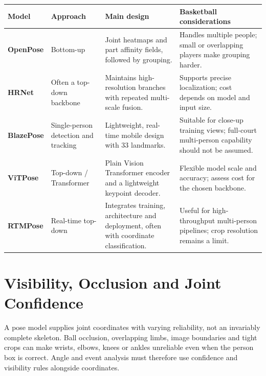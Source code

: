 \documentclass[11pt,a4paper,oneside]{report}
\begin{document}
\begin{tabularx}{\textwidth}{>{\bfseries\RaggedRight}p{2.7cm} p{3.1cm} Y Y}
\toprule
Model & Approach & Main design & Basketball considerations \\
\midrule
OpenPose & Bottom-up & Joint heatmaps and part affinity fields, followed by grouping. & Handles multiple people; small or overlapping players make grouping harder.\\
HRNet & Often a top-down backbone & Maintains high-resolution branches with repeated multi-scale fusion. & Supports precise localization; cost depends on model and input size.\\
BlazePose & Single-person detection and tracking & Lightweight, real-time mobile design with 33 landmarks. & Suitable for close-up training views; full-court multi-person capability should not be assumed.\\
ViTPose & Top-down / Transformer & Plain Vision Transformer encoder and a lightweight keypoint decoder. & Flexible model scale and accuracy; assess cost for the chosen backbone.\\
RTMPose & Real-time top-down & Integrates training, architecture and deployment, often with coordinate classification. & Useful for high-throughput multi-person pipelines; crop resolution remains a limit.\\
\bottomrule
\end{tabularx}



\section{Visibility, Occlusion and Joint Confidence}

A pose model supplies joint coordinates with varying reliability, not an invariably complete skeleton. Ball occlusion, overlapping limbs, image boundaries and tight crops can make wrists, elbows, knees or ankles unreliable even when the person box is correct. Angle and event analysis must therefore use confidence and visibility rules alongside coordinates.
\end{document}
